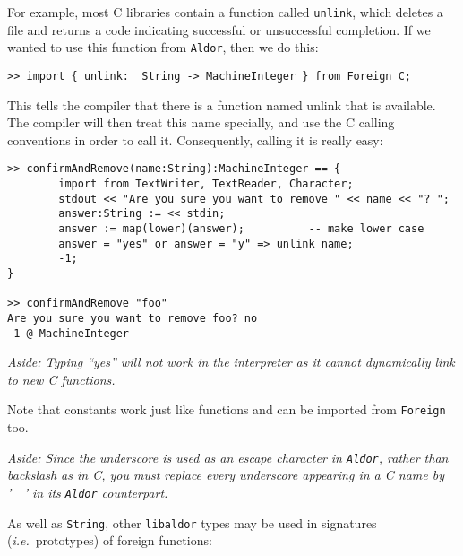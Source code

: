 \documentclass{article}
\newcommand{\ie}{{\it i.e.}}
\newcommand{\libaldor}{{\tt libaldor}}
\newcommand{\Aldor}{{\tt Aldor}}
\begin{document}
For example, most C libraries contain a function called {\tt unlink},
which deletes a file and returns a code indicating successful
or unsuccessful completion.
If we wanted to use this function from \Aldor{}, then we do this:

\begin{small}
\begin{verbatim}
>> import { unlink:  String -> MachineInteger } from Foreign C;
\end{verbatim}
\end{small}

This tells the compiler that there is a function named unlink
that is available. %
The compiler will then treat this name specially, and use the C
calling conventions in order to call it.  Consequently, calling it
is really easy:

\begin{small}
\begin{verbatim}
>> confirmAndRemove(name:String):MachineInteger == {
        import from TextWriter, TextReader, Character;
        stdout << "Are you sure you want to remove " << name << "? ";
        answer:String := << stdin;
        answer := map(lower)(answer);          -- make lower case
        answer = "yes" or answer = "y" => unlink name;
        -1;
}

>> confirmAndRemove "foo"
Are you sure you want to remove foo? no 
-1 @ MachineInteger
\end{verbatim}
\end{small}

{\em Aside: Typing ``yes'' will not work in the interpreter as it cannot
dynamically link to new C functions.}

Note that constants work just like functions and can be imported from
{\tt Foreign} too.

{\em Aside:
Since the underscore is used as an escape character in \Aldor{},
rather than backslash as in C, you must replace every underscore
appearing in a C name by '\verb!__!' in its \Aldor{} counterpart.}

As well as {\tt String}, other \libaldor{} types may be used in
signatures (\ie~prototypes) of foreign functions:
\end{document}
